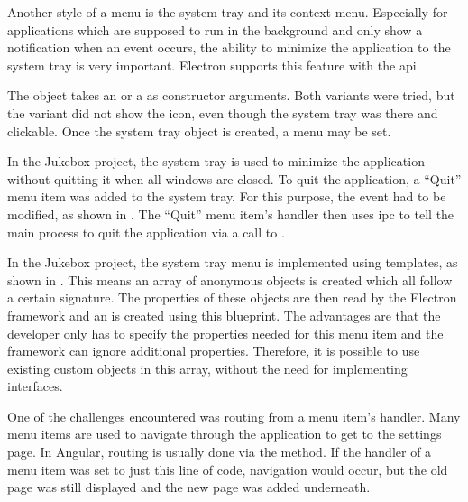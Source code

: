 Another style of a menu is the system tray and its context menu. Especially for applications which are supposed to run in the background and only show a notification when an event occurs, the ability to minimize the application to the system tray is very important. Electron supports this feature with the  \gls{api}.

The  object takes an  or a  as constructor arguments. Both variants were tried, but the  variant did not show the icon, even though the system tray was there and clickable. Once the system tray object is created, a menu may be set.


In the Jukebox project, the system tray is used to minimize the application without quitting it when all windows are closed. To quit the application, a \enquote{Quit} menu item was added to the system tray. For this purpose, the  event had to be modified, as shown in . The \enquote{Quit} menu item's  handler then uses \gls{ipc} to tell the main process to quit the application via a call to .


In the Jukebox project, the system tray menu is implemented using templates, as shown in . This means an array of anonymous objects is created which all follow a certain signature. The properties of these objects are then read by the Electron framework and an  is created using this blueprint. The advantages are that the developer only has to specify the properties needed for this menu item and the framework can ignore additional properties. Therefore, it is possible to use existing custom objects in this array, without the need for implementing interfaces.


One of the challenges encountered was routing from a menu item's  handler. Many menu items are used to navigate through the application \zB to get to the settings page. In Angular, routing is usually done via the  method. If the  handler of a menu item was set to just this line of code, navigation would occur, but the old page was still displayed and the new page was added underneath.

